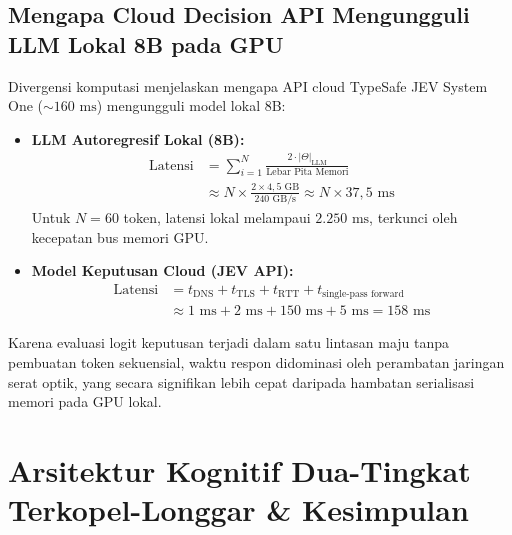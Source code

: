 \documentclass[journal,compsoc]{IEEEtran}
\begin{document}
\subsection{Mengapa Cloud Decision API Mengungguli LLM Lokal 8B pada GPU}
Divergensi komputasi menjelaskan mengapa API cloud TypeSafe JEV System One ($\sim 160 \text{ ms}$) mengungguli model lokal 8B:
\begin{itemize}
    \item \textbf{LLM Autoregresif Lokal (8B):}
    \begin{equation}
    \begin{aligned}
    \text{Latensi} &= \sum_{i=1}^{N} \frac{2 \cdot |\Theta|_{\text{LLM}}}{\text{Lebar Pita Memori}} \\
    &\approx N \times \frac{2 \times 4{,}5 \text{ GB}}{240 \text{ GB/s}} \approx N \times 37{,}5 \text{ ms}
    \end{aligned}
    \end{equation}
    Untuk $N = 60$ token, latensi lokal melampaui $2.250 \text{ ms}$, terkunci oleh kecepatan bus memori GPU.
    \item \textbf{Model Keputusan Cloud (JEV API):}
    \begin{align}
    \text{Latensi} &= t_{\text{DNS}} + t_{\text{TLS}} + t_{\text{RTT}} + t_{\text{single-pass forward}} \nonumber \\
    &\approx 1 \text{ ms} + 2 \text{ ms} + 150 \text{ ms} + 5 \text{ ms} = 158 \text{ ms}
    \end{align}
\end{itemize}
Karena evaluasi logit keputusan terjadi dalam satu lintasan maju tanpa pembuatan token sekuensial, waktu respon didominasi oleh perambatan jaringan serat optik, yang secara signifikan lebih cepat daripada hambatan serialisasi memori pada GPU lokal.

\section{Arsitektur Kognitif Dua-Tingkat Terkopel-Longgar \& Kesimpulan}
\end{document}
